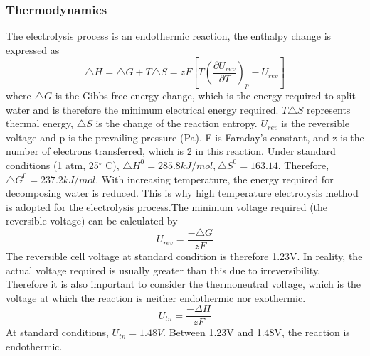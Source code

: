\subsubsection{Thermodynamics} 
The electrolysis process is an endothermic reaction, the enthalpy change is expressed as
\begin{equation} 
\triangle H =\triangle G + T\triangle S = zF[T(\frac{\partial U_{rev}}{\partial T})_p - U_{rev}]
\end{equation} 
where $\triangle G $ is the Gibbs free energy change, which is the energy required to split water and is therefore the minimum electrical energy required. $T\triangle S$ represents thermal energy, $\triangle S$ is the change of the reaction entropy. $U_{rev}$ is the reversible voltage and p is the prevailing pressure (Pa). F is Faraday's constant, and z is the number of electrons transferred, which is 2 in this reaction.\cite{gibbs}  
Under standard conditions (1 atm, 25$^{\circ}$ C), $\triangle H^0 = 285.8 kJ/mol, \triangle S^0 = 163.14$. Therefore, $\triangle G^0 = 237.2 kJ/mol.$ With increasing temperature, the energy required for decomposing water is reduced. This is why high temperature electrolysis method is adopted for the electrolysis process.The minimum voltage required (the reversible voltage) can be calculated by
\begin{equation} 
U_{rev} =\frac {-\triangle G} {zF} 
\end{equation} 
The reversible cell voltage at standard condition is therefore 1.23V. In reality, the actual voltage required is usually greater than this due to irreversibility. Therefore it is also important to consider the thermoneutral voltage, which is the voltage at which the reaction is neither endothermic nor exothermic. 
\begin{equation} 
U_{tn}=\frac{-\Delta H} {zF}
\end{equation} 
At standard conditions, $U_{tn} = 1.48V.$ Between 1.23V and 1.48V, the reaction is endothermic.\cite{thermoneutral} 

